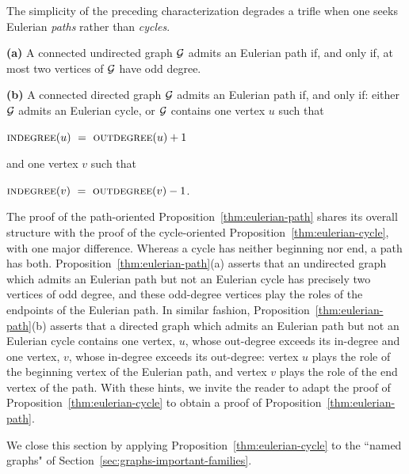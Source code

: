 The simplicity of the preceding characterization degrades a trifle when
one seeks Eulerian {\em paths} rather than {\em cycles}.

\begin{prop}
\label{thm:eulerian-path}
{\bf (a)}
A connected undirected graph $\mbox{$\cal G$}$ admits an Eulerian path if, and only if,
at most two vertices of $\mbox{$\cal G$}$ have odd degree.

{\bf (b)}
A connected directed graph $\mbox{$\cal G$}$ admits an Eulerian path if, and only if: either $\mbox{$\cal G$}$ admits an 
Eulerian cycle, or $\mbox{$\cal G$}$ contains one vertex $u$ such that

\hspace*{.5in}$\mbox{\sc indegree}(u) \ = \ \mbox{\sc outdegree}(u) +1$

\noindent
and one vertex $v$ such that

\hspace*{.5in}$\mbox{\sc indegree}(v) \ = \ \mbox{\sc outdegree}(v) -1$.
\end{prop}

The proof of the path-oriented Proposition~\ref{thm:eulerian-path} shares its overall structure
with the proof of the cycle-oriented Proposition~\ref{thm:eulerian-cycle}, with one major difference.
Whereas a cycle has neither beginning nor end, a path has both. 
Proposition~\ref{thm:eulerian-path}(a) asserts that an undirected graph which admits an
Eulerian path but not an Eulerian cycle has precisely two vertices of odd degree, and these 
odd-degree vertices play the roles of the endpoints of the Eulerian path.  In similar fashion,
Proposition~\ref{thm:eulerian-path}(b) asserts that a directed graph which admits an Eulerian
path but not an Eulerian cycle contains one vertex, $u$, whose out-degree exceeds its
in-degree and one vertex, $v$, whose in-degree exceeds its out-degree: vertex $u$ plays the role of
the beginning vertex of the Eulerian path, and vertex $v$ plays the role of the end vertex of the path.
With these hints, we invite the reader to adapt the proof of Proposition~\ref{thm:eulerian-cycle} to
obtain a proof of Proposition~\ref{thm:eulerian-path}.

\bigskip

We close this section by applying Proposition~\ref{thm:eulerian-cycle}
to the ``named graphs" of Section~\ref{sec:graphs-important-families}.

\medskip

